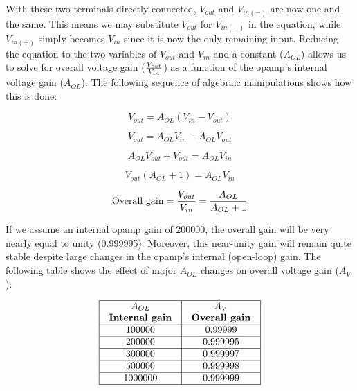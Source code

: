 With these two terminals directly connected, $V_{out}$ and $V_{in(-)}$ are now one and the same.  This means we may substitute $V_{out}$ for $V_{in(-)}$ in the equation, while $V_{in(+)}$ simply becomes $V_{in}$ since it is now the only remaining input.  Reducing the equation to the two variables of $V_{out}$ and $V_{in}$ and a constant ($A_{OL}$) allows us to solve for overall voltage gain ($V_{out} \over V_{in}$) as a function of the opamp's internal voltage gain ($A_{OL}$).  The following sequence of algebraic manipulations shows how this is done:

$$V_{out} = A_{OL}(V_{in} - V_{out})$$

$$V_{out} = A_{OL}V_{in} - A_{OL}V_{out}$$

$$A_{OL}V_{out} + V_{out} = A_{OL}V_{in}$$

$$V_{out} (A_{OL} + 1) = A_{OL}V_{in}$$

$$\hbox{Overall gain} = {V_{out} \over V_{in}} = {A_{OL} \over {A_{OL} + 1}}$$

\filbreak

If we assume an internal opamp gain of 200000, the overall gain will be very nearly equal to unity (0.999995).  Moreover, this near-unity gain will remain quite stable despite large changes in the opamp's internal (open-loop) gain.  The following table shows the effect of major $A_{OL}$ changes on overall voltage gain ($A_V$):


$$\vbox{\offinterlineskip
\halign{\strut
\vrule \quad\hfil # \ \hfil & 
\vrule \quad\hfil # \ \hfil \vrule \cr
\noalign{\hrule}
%
$A_{OL}$ & $A_V$ \cr
%
\textbf{Internal gain} & \textbf{Overall gain} \cr
%
\noalign{\hrule}
%
100000 & 0.99999 \cr
%
\noalign{\hrule}
%
200000 & 0.999995 \cr
%
\noalign{\hrule}
%
300000 & 0.999997 \cr
%
\noalign{\hrule}
%
500000 & 0.999998 \cr
%
\noalign{\hrule}
%
1000000 & 0.999999 \cr
%
\noalign{\hrule}
\noalign{\hrule}
} %
}$$ %

